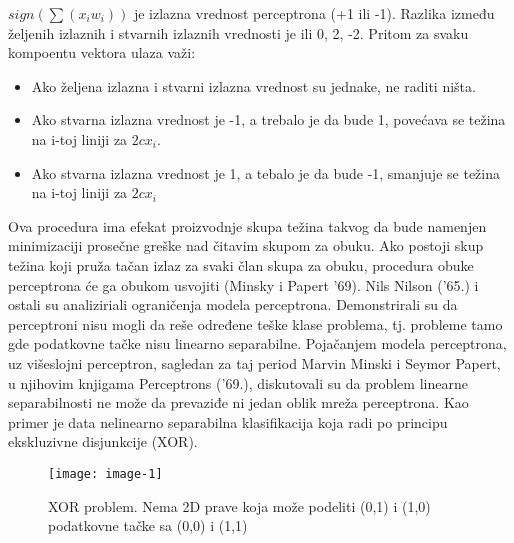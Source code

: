 \documentclass[fontsize=11bp, paper=a4]{scrarticle}
\begin{document}
$sign(\sum (x_i w_i))$ je izlazna vrednost perceptrona (+1 ili -1). Razlika između željenih izlaznih i stvarnih izlaznih vrednosti je ili 0, 2, -2. Pritom za svaku kompoentu vektora ulaza važi:
\begin{itemize}
    \item Ako željena izlazna i stvarni izlazna vrednost su jednake, ne raditi ništa.
    \item Ako stvarna izlazna vrednost je -1, a trebalo je da bude 1, povećava se težina na i-toj liniji za $2cx_i$.
    \item Ako stvarna izlazna vrednost je 1, a tebalo je da bude -1, smanjuje se težina na i-toj liniji za $2cx_i$
\end{itemize}
Ova procedura ima efekat proizvodnje skupa težina takvog da bude namenjen minimizaciji prosečne greške nad čitavim skupom za obuku. Ako postoji skup težina koji pruža tačan izlaz za svaki član skupa za obuku, procedura obuke perceptrona će ga obukom usvojiti (Minsky i Papert '69).
Nils Nilson ('65.) i ostali su analiziriali ograničenja modela perceptrona. Demonstrirali su da perceptroni nisu mogli da reše određene teške klase problema, tj. probleme tamo gde podatkovne tačke nisu linearno separabilne. Pojačanjem modela perceptrona, uz višeslojni perceptron, sagledan za taj period Marvin Minski i Seymor Papert, u njihovim knjigama Perceptrons ('69.), diskutovali su da problem linearne separabilnosti ne može da prevaziđe ni jedan oblik mreža perceptrona. Kao primer je data nelinearno separabilna klasifikacija koja radi po principu ekskluzivne disjunkcije (XOR).

\begin{figure}[h]
    \centering
    \texttt{[image: image-1]}
    \caption{XOR problem. Nema 2D prave koja može podeliti (0,1) i (1,0) podatkovne tačke sa (0,0) i (1,1)}
\end{figure}
\end{document}
